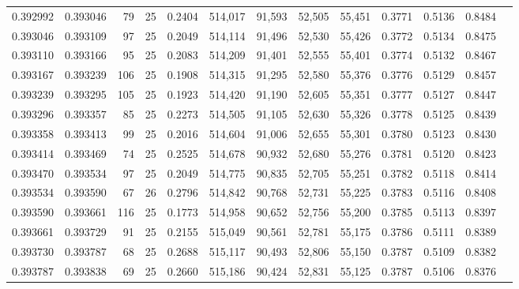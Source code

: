 \begin{tabular}{rrrrrrrrrrrrr}
0.392992 & 0.393046 &    79 &  25 &                                     0.2404 & 514,017 &  91,593 &  52,505 &  55,451 & 0.3771 & 0.5136 & 0.8484 \\
0.393046 & 0.393109 &    97 &  25 &                                     0.2049 & 514,114 &  91,496 &  52,530 &  55,426 & 0.3772 & 0.5134 & 0.8475 \\
0.393110 & 0.393166 &    95 &  25 &                                     0.2083 & 514,209 &  91,401 &  52,555 &  55,401 & 0.3774 & 0.5132 & 0.8467 \\
0.393167 & 0.393239 &   106 &  25 &                                     0.1908 & 514,315 &  91,295 &  52,580 &  55,376 & 0.3776 & 0.5129 & 0.8457 \\
0.393239 & 0.393295 &   105 &  25 &                                     0.1923 & 514,420 &  91,190 &  52,605 &  55,351 & 0.3777 & 0.5127 & 0.8447 \\
0.393296 & 0.393357 &    85 &  25 &                                     0.2273 & 514,505 &  91,105 &  52,630 &  55,326 & 0.3778 & 0.5125 & 0.8439 \\
0.393358 & 0.393413 &    99 &  25 &                                     0.2016 & 514,604 &  91,006 &  52,655 &  55,301 & 0.3780 & 0.5123 & 0.8430 \\
0.393414 & 0.393469 &    74 &  25 &                                     0.2525 & 514,678 &  90,932 &  52,680 &  55,276 & 0.3781 & 0.5120 & 0.8423 \\
0.393470 & 0.393534 &    97 &  25 &                                     0.2049 & 514,775 &  90,835 &  52,705 &  55,251 & 0.3782 & 0.5118 & 0.8414 \\
0.393534 & 0.393590 &    67 &  26 &                                     0.2796 & 514,842 &  90,768 &  52,731 &  55,225 & 0.3783 & 0.5116 & 0.8408 \\
0.393590 & 0.393661 &   116 &  25 &                                     0.1773 & 514,958 &  90,652 &  52,756 &  55,200 & 0.3785 & 0.5113 & 0.8397 \\
0.393661 & 0.393729 &    91 &  25 &                                     0.2155 & 515,049 &  90,561 &  52,781 &  55,175 & 0.3786 & 0.5111 & 0.8389 \\
0.393730 & 0.393787 &    68 &  25 &                                     0.2688 & 515,117 &  90,493 &  52,806 &  55,150 & 0.3787 & 0.5109 & 0.8382 \\
0.393787 & 0.393838 &    69 &  25 &                                     0.2660 & 515,186 &  90,424 &  52,831 &  55,125 & 0.3787 & 0.5106 & 0.8376 \\

\end{tabular}

